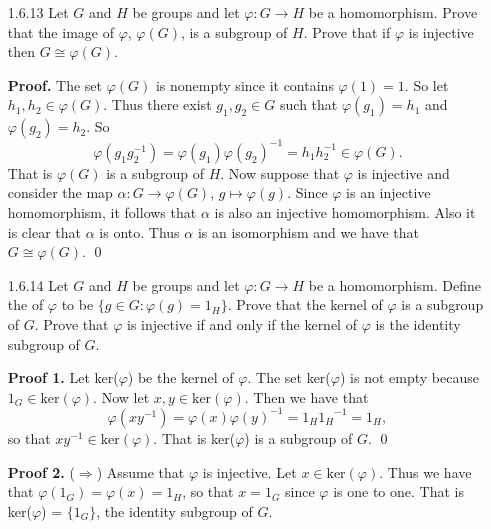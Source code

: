 \begin{enumerate}
      \textbf{Proof.} Proceed as we did in Exercise 1.6.11 with the following
      modification:
      $$f : G \times C \rightarrow A \times H,
        \quad((a, b), c) \mapsto (a, (b, c))$$ and 
      $$g : A \times H\rightarrow G\times C,
        \quad (a, (b, c)) \mapsto ((a, b), c).$$ \qed
   \item[1.6.13]  Let $G$ and $H$ be groups and let $\varphi : G \rightarrow H$
                  be a homomorphism. Prove that the image of $\varphi$,
                  $\varphi(G)$, is a subgroup of $H$. Prove that if $\varphi$ is
                  injective then $G \cong \varphi(G)$.

      \textbf{Proof.} The set $\varphi(G)$ is nonempty since it contains
      $\varphi(1) = 1$. So let $h_1, h_2 \in \varphi(G)$. Thus there exist
      $g_1, g_2 \in G$ such that $\varphi(g_1) = h_1$ and $\varphi(g_2) = h_2$. 
      So
      $$\varphi(g_1g_2^{-1}) = \varphi(g_1)\varphi(g_2)^{-1} = h_1h_2^{-1} \in
        \varphi(G).$$
      That is $\varphi(G)$ is a subgroup of $H$. Now suppose that $\varphi$ is
      injective and consider the map $\alpha : G \rightarrow \varphi(G)$,
      $g \mapsto \varphi(g)$. Since $\varphi$ is an injective homomorphism, it
      follows that $\alpha$ is also an injective homomorphism. Also it is clear
      that $\alpha$ is onto. Thus $\alpha$ is an isomorphism and we have that
      $G \cong \varphi(G)$. \qed
   \item[1.6.14]  Let $G$ and $H$ be groups and let $\varphi : G \rightarrow H$
                  be a homomorphism. Define the  of $\varphi$ to be
                  $\{g \in G : \varphi(g) = 1_H\}$. Prove that the kernel of
                  $\varphi$ is a subgroup of $G$. Prove that $\varphi$ is
                  injective if and only if the kernel of $\varphi$ is the
                  identity subgroup of $G$.

      \textbf{Proof 1.} Let ker($\varphi$) be the kernel of $\varphi$. The set
      ker($\varphi$) is not empty because $1_G \in \text{ker}(\varphi)$. Now let
      $x, y \in \text{ker}(\varphi)$. Then we have that
      $$\varphi(xy^{-1}) = \varphi(x)\varphi(y)^{-1} = 1_H{1_H}^{-1} = 1_H,$$
      so that $xy^{-1} \in \text{ker}(\varphi)$. That is ker($\varphi$) is a
      subgroup of $G$. \qed

      \textbf{Proof 2.} ($\Rightarrow$) Assume that $\varphi$ is injective. Let
      $x \in \text{ker}(\varphi)$. Thus we have that
      $\varphi(1_G) = \varphi(x) = 1_H$, so that $x = 1_G$ since $\varphi$ is
      one to one. That is ker($\varphi$) = $\{1_G\}$, the identity subgroup of
      $G$.


\end{enumerate}
